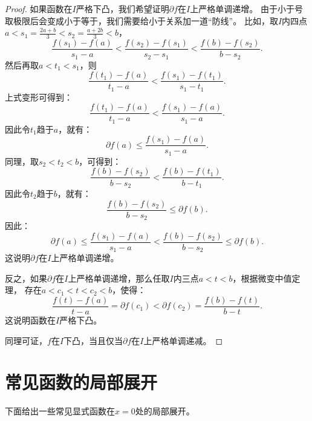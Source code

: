 \documentclass[12pt,UTF8]{ctexbook}
\begin{document}
\begin{appendix}
\begin{proof}
    如果函数在$I$严格下凸，我们希望证明$\partial f$在$I$上严格单调递增。
    由于小于号取极限后会变成小于等于，我们需要给小于关系加一道“防线”。
    比如，取$I$内四点$a < s_1 = \frac{2a + b}{3} < s_2 = \frac{a + 2b}{3} < b$，
    $$ \frac{f(s_1) - f(a)}{s_1 - a} < \frac{f(s_2) - f(s_1)}{s_2 - s_1} < \frac{f(b) - f(s_2)}{b - s_2}. $$
    然后再取$a < t_1 < s_1$，则
    $$ \frac{f(t_1) - f(a)}{t_1 - a} < \frac{f(s_1) - f(t_1)}{s_1 - t_1}. $$
    上式变形可得到：
    $$ \frac{f(t_1) - f(a)}{t_1 - a} < \frac{f(s_1) - f(a)}{s_1 - a}. $$
    因此令$t_1$趋于$a$，就有：
    $$ \partial f(a) \leqslant \frac{f(s_1) - f(a)}{s_1 - a}.$$
    同理，取$s_2 < t_2 < b$，可得到：
    $$ \frac{f(b) - f(s_2)}{b - s_2} < \frac{f(b) - f(t_1)}{b - t_1}. $$
    因此令$t_2$趋于$b$，就有：
    $$ \frac{f(b) - f(s_2)}{b - s_2} \leqslant \partial f(b).$$
    因此：
    $$ \partial f(a) \leqslant \frac{f(s_1) - f(a)}{s_1 - a} < \frac{f(b) - f(s_2)}{b - s_2} \leqslant \partial f(b).$$
    这说明$\partial f$在$I$上严格单调递增。
    
    反之，如果$\partial f$在$I$上严格单调递增，那么任取$I$内三点$a < t < b$，根据微变中值定理，
    存在$a < c_1 < t < c_2 < b$，使得：
    $$ \frac{f(t) - f(a)}{t - a} = \partial f(c_1) < \partial f(c_2) = \frac{f(b) - f(t)}{b - t}. $$
    这说明函数在$I$严格下凸。

    同理可证，$f$在$I$下凸，当且仅当$\partial f$在$I$上严格单调递减。

\end{proof}

\section{常见函数的局部展开}

下面给出一些常见显式函数在$x = 0$处的局部展开。


\end{appendix}
\end{document}
